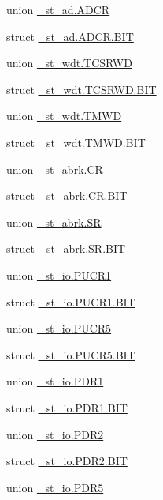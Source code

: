 \begin{DoxyCompactItemize}
\item 
union \hyperlink{3694s_8h_d5/d88/union__st__ad_8ADCR}{\+\_\+st\+\_\+ad.\+A\+D\+C\+R}
\item 
struct \hyperlink{3694s_8h_de/d48/struct__st__ad_8ADCR_8BIT}{\+\_\+st\+\_\+ad.\+A\+D\+C\+R.\+B\+I\+T}
\item 
union \hyperlink{3694s_8h_d5/d6e/union__st__wdt_8TCSRWD}{\+\_\+st\+\_\+wdt.\+T\+C\+S\+R\+W\+D}
\item 
struct \hyperlink{3694s_8h_d9/d2a/struct__st__wdt_8TCSRWD_8BIT}{\+\_\+st\+\_\+wdt.\+T\+C\+S\+R\+W\+D.\+B\+I\+T}
\item 
union \hyperlink{3694s_8h_d1/d88/union__st__wdt_8TMWD}{\+\_\+st\+\_\+wdt.\+T\+M\+W\+D}
\item 
struct \hyperlink{3694s_8h_d9/d28/struct__st__wdt_8TMWD_8BIT}{\+\_\+st\+\_\+wdt.\+T\+M\+W\+D.\+B\+I\+T}
\item 
union \hyperlink{3694s_8h_d5/dc3/union__st__abrk_8CR}{\+\_\+st\+\_\+abrk.\+C\+R}
\item 
struct \hyperlink{3694s_8h_d6/d55/struct__st__abrk_8CR_8BIT}{\+\_\+st\+\_\+abrk.\+C\+R.\+B\+I\+T}
\item 
union \hyperlink{3694s_8h_d9/de2/union__st__abrk_8SR}{\+\_\+st\+\_\+abrk.\+S\+R}
\item 
struct \hyperlink{3694s_8h_d8/d8d/struct__st__abrk_8SR_8BIT}{\+\_\+st\+\_\+abrk.\+S\+R.\+B\+I\+T}
\item 
union \hyperlink{3694s_8h_da/db8/union__st__io_8PUCR1}{\+\_\+st\+\_\+io.\+P\+U\+C\+R1}
\item 
struct \hyperlink{3694s_8h_d8/d14/struct__st__io_8PUCR1_8BIT}{\+\_\+st\+\_\+io.\+P\+U\+C\+R1.\+B\+I\+T}
\item 
union \hyperlink{3694s_8h_d3/d03/union__st__io_8PUCR5}{\+\_\+st\+\_\+io.\+P\+U\+C\+R5}
\item 
struct \hyperlink{3694s_8h_d1/da6/struct__st__io_8PUCR5_8BIT}{\+\_\+st\+\_\+io.\+P\+U\+C\+R5.\+B\+I\+T}
\item 
union \hyperlink{3694s_8h_dc/df3/union__st__io_8PDR1}{\+\_\+st\+\_\+io.\+P\+D\+R1}
\item 
struct \hyperlink{3694s_8h_d8/d7a/struct__st__io_8PDR1_8BIT}{\+\_\+st\+\_\+io.\+P\+D\+R1.\+B\+I\+T}
\item 
union \hyperlink{3694s_8h_d8/d84/union__st__io_8PDR2}{\+\_\+st\+\_\+io.\+P\+D\+R2}
\item 
struct \hyperlink{3694s_8h_df/d88/struct__st__io_8PDR2_8BIT}{\+\_\+st\+\_\+io.\+P\+D\+R2.\+B\+I\+T}
\item 
union \hyperlink{3694s_8h_dc/d2a/union__st__io_8PDR5}{\+\_\+st\+\_\+io.\+P\+D\+R5}

\end{DoxyCompactItemize}
